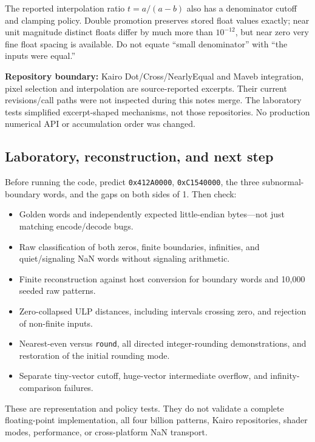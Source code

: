 The reported interpolation ratio \(t=a/(a-b)\) also has a denominator cutoff and clamping policy. Double promotion preserves stored float values exactly; near unit magnitude distinct floats differ by much more than \(10^{-12}\), but near zero very fine float spacing is available. Do not equate ``small denominator'' with ``the inputs were equal.''

\textbf{Repository boundary:} Kairo Dot/Cross/NearlyEqual and Maveb integration, pixel selection and interpolation are source-reported excerpts. Their current revisions/call paths were not inspected during this notes merge. The laboratory tests simplified excerpt-shaped mechanisms, not those repositories. No production numerical API or accumulation order was changed.

\subsection{Laboratory, reconstruction, and next step}\label{05-engine-i-ch001-laboratory-reconstruction-and-next-step}

Before running the code, predict \texttt{0x412A0000}, \texttt{0xC1540000}, the three subnormal-boundary words, and the gaps on both sides of 1. Then check:

\begin{itemize}
\tightlist
\item
  Golden words and independently expected little-endian bytes---not just matching encode/decode bugs.
\item
  Raw classification of both zeros, finite boundaries, infinities, and quiet/signaling NaN words without signaling arithmetic.
\item
  Finite reconstruction against host conversion for boundary words and 10,000 seeded raw patterns.
\item
  Zero-collapsed ULP distances, including intervals crossing zero, and rejection of non-finite inputs.
\item
  Nearest-even versus \texttt{round}, all directed integer-rounding demonstrations, and restoration of the initial rounding mode.
\item
  Separate tiny-vector cutoff, huge-vector intermediate overflow, and infinity-comparison failures.
\end{itemize}

These are representation and policy tests. They do not validate a complete floating-point implementation, all four billion patterns, Kairo repositories, shader modes, performance, or cross-platform NaN transport.

